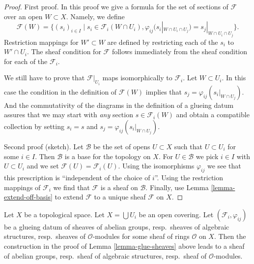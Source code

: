 \begin{proof}
First proof. In this proof we give a formula for the set of sections
of $\mathcal{F}$ over an open $W \subset X$. Namely, we define
$$
\mathcal{F}(W) =
\{
(s_i)_{i \in I} \mid
s_i \in \mathcal{F}_i(W \cap U_i),
\varphi_{ij}(s_i|_{W \cap U_i \cap U_j}) = s_j|_{W \cap U_i \cap U_j}
\}.
$$
Restriction mappings for $W' \subset W$ are defined by restricting
each of the $s_i$ to $W' \cap U_i$. The sheaf condition for $\mathcal{F}$
follows immediately from the sheaf condition for each of the
$\mathcal{F}_i$.

\medskip\noindent
We still have to prove that $\mathcal{F}|_{U_i}$ maps
isomorphically to $\mathcal{F}_i$. Let $W \subset U_i$.
In this case the condition in the definition of
$\mathcal{F}(W)$ implies that $s_j = \varphi_{ij}(s_i|_{W \cap U_j})$.
And the commutativity of the diagrams in the definition
of a glueing datum assures that we may start with {\it any}
section $s \in \mathcal{F}_i(W)$ and obtain a compatible
collection by setting $s_i = s$ and $s_j = \varphi_{ij}(s_i|_{W \cap U_j})$.

\medskip\noindent
Second proof (sketch). Let $\mathcal{B}$ be the set of opens $U \subset X$
such that $U \subset U_i$ for some $i \in I$. Then $\mathcal{B}$
is a base for the topology on $X$. For $U \in \mathcal{B}$ we pick
$i \in I$ with $U \subset U_i$ and we set $\mathcal{F}(U) = \mathcal{F}_i(U)$.
Using the isomorphisms $\varphi_{ij}$ we see that this prescription
is ``independent of the choice of $i$''. Using the restriction mappings
of $\mathcal{F}_i$ we find that $\mathcal{F}$ is a sheaf on $\mathcal{B}$.
Finally, use Lemma \ref{lemma-extend-off-basis} to extend $\mathcal{F}$
to a unique sheaf $\mathcal{F}$ on $X$.
\end{proof}

\begin{lemma}
\label{lemma-glue-sheaves-structures}
\begin{reference}
\cite[Chapter I, \S 1, no. 4, Proposition 4, pp. 201--202]{FAC}
\end{reference}
Let $X$ be a topological space.
Let $X = \bigcup U_i$ be an open covering.
Let $(\mathcal{F}_i, \varphi_{ij})$ be a glueing datum
of sheaves of abelian groups, resp.\ sheaves of algebraic structures,
resp.\ sheaves of $\mathcal{O}$-modules for some sheaf of rings
$\mathcal{O}$ on $X$. Then the construction in the proof of
Lemma \ref{lemma-glue-sheaves} above leads to a sheaf
of abelian groups, resp.\ sheaf of algebraic structures,
resp.\ sheaf of $\mathcal{O}$-modules.
\end{lemma}

